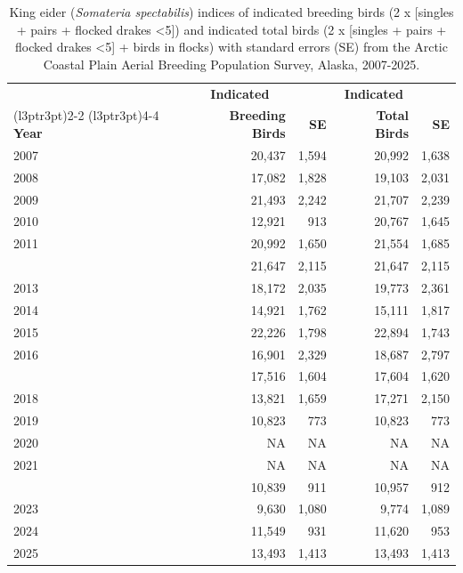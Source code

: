 \documentclass[
]{article}
\begin{document}
\begin{longtable}[t]{lrrrr}

\caption{\label{tbl-KIEI}King eider (\emph{Somateria spectabilis})
indices of indicated breeding birds (2 x {[}singles + pairs + flocked
drakes \textless5{]}) and indicated total birds (2 x {[}singles + pairs
+ flocked drakes \textless5{]} + birds in flocks) with standard errors
(SE) from the Arctic Coastal Plain Aerial Breeding Population Survey,
Alaska, 2007-2025.}

\tabularnewline

\\
\toprule
\multicolumn{1}{c}{\textbf{ }} & \multicolumn{1}{c}{\textbf{Indicated}} & \multicolumn{1}{c}{\textbf{ }} & \multicolumn{1}{c}{\textbf{Indicated}} & \multicolumn{1}{c}{\textbf{ }} \\
\cmidrule(l{3pt}r{3pt}){2-2} \cmidrule(l{3pt}r{3pt}){4-4}
\textbf{Year} & \textbf{Breeding Birds} & \textbf{SE} & \textbf{Total Birds} & \textbf{SE}\\
\midrule
2007 & 20,437 & 1,594 & 20,992 & 1,638\\
2008 & 17,082 & 1,828 & 19,103 & 2,031\\
2009 & 21,493 & 2,242 & 21,707 & 2,239\\
2010 & 12,921 & 913 & 20,767 & 1,645\\
2011 & 20,992 & 1,650 & 21,554 & 1,685\\
\addlinespace
2012 & 21,647 & 2,115 & 21,647 & 2,115\\
2013 & 18,172 & 2,035 & 19,773 & 2,361\\
2014 & 14,921 & 1,762 & 15,111 & 1,817\\
2015 & 22,226 & 1,798 & 22,894 & 1,743\\
2016 & 16,901 & 2,329 & 18,687 & 2,797\\
\addlinespace
2017 & 17,516 & 1,604 & 17,604 & 1,620\\
2018 & 13,821 & 1,659 & 17,271 & 2,150\\
2019 & 10,823 & 773 & 10,823 & 773\\
2020 & NA & NA & NA & NA\\
2021 & NA & NA & NA & NA\\
\addlinespace
2022 & 10,839 & 911 & 10,957 & 912\\
2023 & 9,630 & 1,080 & 9,774 & 1,089\\
2024 & 11,549 & 931 & 11,620 & 953\\
2025 & 13,493 & 1,413 & 13,493 & 1,413\\
\bottomrule

\end{longtable}
\end{document}
